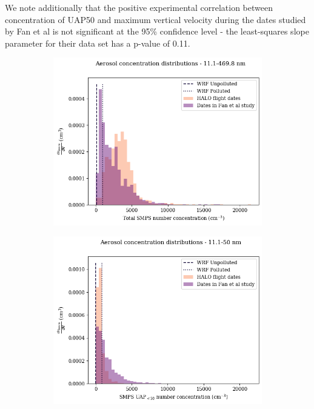 \documentclass{article}
\begin{document}
We note additionally that the positive experimental correlation between concentration of UAP50 and maximum vertical velocity during the dates studied by Fan et al is not significant at the 95\% confidence level - the least-squares slope parameter for their data set has a p-value of 0.11.
\begin{figure}[ht]
	\centering
	\begin{subfigure}{0.7\textwidth}
		\includegraphics[width=\textwidth]{goama/v1_FINAL_tot_compare_nconc_hist_alldates_figure.png}
		\label{goamazontothist}
		\caption{}
	\end{subfigure}
	\begin{subfigure}{0.7\textwidth}
		\includegraphics[width=\textwidth]{goama/v1_FINAL_uap50_compare_nconc_hist_alldates_figure.png}

\end{subfigure}
\end{figure}
\end{document}
